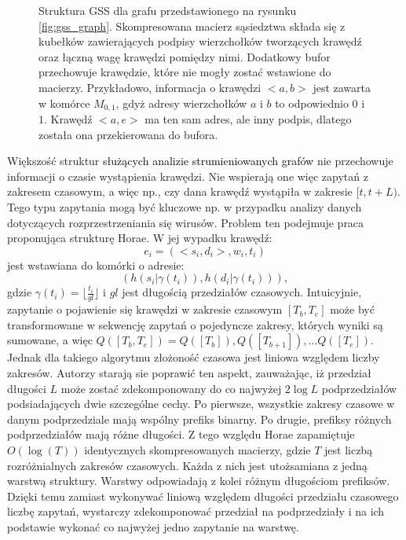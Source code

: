 \begin{figure}[htb]
\begin{tikzpicture}[scale=0.8, every node/.style={scale=0.8},legend node/.style={minimum height=5mm, minimum width=5mm, draw},
                legend text/.style={right}]
    \end{tikzpicture}
            \caption[Struktura GSS]{Struktura GSS dla grafu przedstawionego na rysunku \ref{fig:gss_graph}. Skompresowana macierz sąsiedztwa składa się z kubełków zawierających podpisy wierzchołków tworzących krawędź oraz łączną wagę krawędzi pomiędzy nimi. Dodatkowy bufor przechowuje krawędzie, które nie mogły zostać wstawione do macierzy. Przykładowo, informacja o krawędzi $<a,b>$ jest zawarta w komórce $M_{0,1}$, gdyż adresy wierzchołków $a$ i $b$ to odpowiednio $0$ i $1$. Krawędź $<a,e>$ ma ten sam adres, ale inny podpis, dlatego została ona przekierowana do bufora.}
    \label{fig:gss_structure}
    \end{figure}

    Większość struktur \textcolor{black}{służących analizie strumieniowanych grafów} nie przechowuje informacji o czasie wystąpienia krawędzi. Nie wspierają one więc zapytań z zakresem czasowym, a więc np., czy dana krawędź wystąpiła w zakresie $[t, t + L)$. Tego typu zapytania mogą być kluczowe np. w przypadku analizy danych dotyczących rozprzestrzeniania się wirusów. Problem ten podejmuje praca proponująca strukturę Horae\cite{Chen_Zhou_Chen_Xiao_Jin_Li_2022}. W jej wypadku krawędź:
    \[
        e_i = (<s_i, d_i>, w_i, t_i)
    \] jest wstawiana do komórki o adresie: 
    \[
        (h(s_i | \gamma(t_i)), h(d_i | \gamma(t_i))),
    \]
    gdzie $\gamma(t_i) = \lfloor \frac{t_i}{gl} \rfloor$ i $gl$ jest długością przedziałów czasowych. Intuicyjnie, zapytanie o pojawienie się krawędzi w zakresie czasowym $[T_b, T_e]$ może być transformowane w sekwencję zapytań o pojedyncze zakresy, których wyniki są sumowane, a więc $Q([T_b, T_e]) = Q([T_b]), Q([T_{b+1}]), \dots Q([T_e])$. Jednak dla takiego algorytmu złożoność czasowa jest liniowa względem liczby zakresów. Autorzy starają sie poprawić ten aspekt, zauważając, iż przedział długości $L$ może zostać zdekomponowany do co najwyżej $2\log{L}$ podprzedziałów podsiadających dwie szczególne cechy. Po pierwsze, wszystkie zakresy czasowe w danym podprzedziale mają wspólny prefiks binarny. Po drugie, prefiksy różnych podprzedziałów mają różne długości. Z tego względu Horae zapamiętuje $O(\log(T))$ identycznych skompresowanych macierzy, gdzie $T$ jest liczbą rozróżnialnych zakresów czasowych. Każda z nich jest utożsamiana z jedną warstwą struktury. Warstwy odpowiadają z kolei różnym długościom prefiksów. Dzięki temu zamiast wykonywać liniową względem długości przedziału czasowego liczbę zapytań, wystarczy zdekomponować przedział na podprzedziały i na ich podstawie wykonać co najwyżej jedno zapytanie na warstwę. 
    
